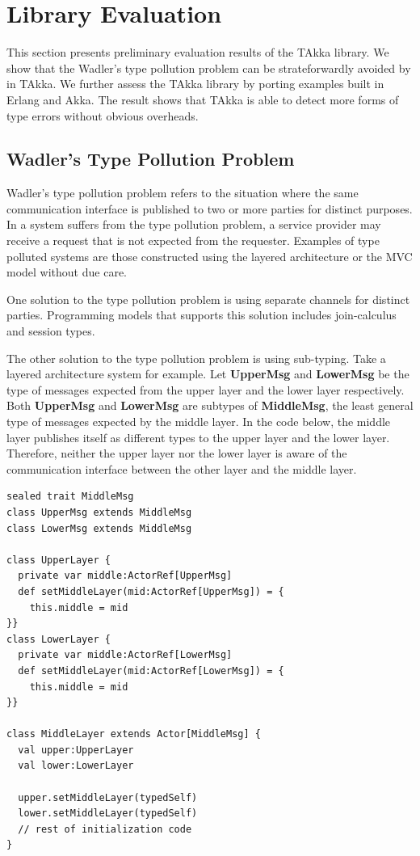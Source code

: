 \section{Library Evaluation}

This section presents preliminary evaluation results of the TAkka library.  
We show that the Wadler's type pollution problem can be strateforwardly avoided by in TAkka.   
We further assess the TAkka library by porting examples built in Erlang and Akka.  The
result shows that TAkka is able to detect more forms of type errors without
obvious overheads.


\subsection{Wadler\rq{}s Type Pollution Problem}
\label{type_pollution}

Wadler\rq{}s type pollution problem refers to the situation where the same
communication interface is published to two or more parties for distinct
purposes.  In a system suffers from the type pollution problem, a service
provider may receive a request that is not expected from the requester.
Examples of type polluted systems are those constructed using the layered
architecture or the MVC model without due care.

One solution to the type pollution problem is using separate channels for
distinct parties.  Programming models that supports this solution includes
join-calculus \cite{full_join} and session types\cite{Honda_languageprimitives}.

The other solution to the type pollution problem is using sub-typing.  Take a
layered architecture system for example. Let {\bf UpperMsg} and {\bf LowerMsg}
be the type of messages expected from the upper layer and the lower layer
respectively.  Both {\bf UpperMsg} and {\bf LowerMsg} are subtypes of {\bf
MiddleMsg}, the least general type of messages expected by the middle layer.
In the code below, the middle layer publishes itself as different types to the
upper layer and the lower layer.  Therefore, neither the upper layer nor the
lower layer is aware of the communication interface between the other
layer and the middle layer.

\begin{lstlisting}
sealed trait MiddleMsg
class UpperMsg extends MiddleMsg
class LowerMsg extends MiddleMsg

class UpperLayer {
  private var middle:ActorRef[UpperMsg]
  def setMiddleLayer(mid:ActorRef[UpperMsg]) = {
    this.middle = mid
}}
class LowerLayer {
  private var middle:ActorRef[LowerMsg]
  def setMiddleLayer(mid:ActorRef[LowerMsg]) = {
    this.middle = mid
}}

class MiddleLayer extends Actor[MiddleMsg] {
  val upper:UpperLayer
  val lower:LowerLayer

  upper.setMiddleLayer(typedSelf)
  lower.setMiddleLayer(typedSelf)
  // rest of initialization code
}
\end{lstlisting}

